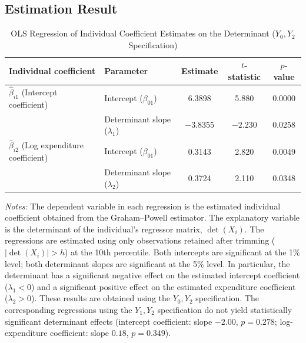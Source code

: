 \documentclass{article}
\begin{document}
\subsection{Estimation Result}

\begin{table}[htbp]
\centering
\caption{OLS Regression of Individual Coefficient Estimates on the Determinant ($Y_0,Y_2$ Specification)}
\label{tab:determinant_regression}
\begin{tabular}{llccc}
\hline
Individual coefficient & Parameter & Estimate & $t$-statistic & $p$-value \\
\hline
$\hat{\beta}_{i1}$ (Intercept coefficient)
& Intercept ($\beta_{01}$)
& 6.3898
& 5.880
& 0.0000 \\

& Determinant slope ($\lambda_1$)
& $-3.8355$
& $-2.230$
& 0.0258\\

\hline

$\hat{\beta}_{i2}$ (Log expenditure coefficient)
& Intercept ($\beta_{01}$)
& 0.3143
& 2.820
& 0.0049 \\

& Determinant slope ($\lambda_2$)
& 0.3724
& 2.110
& 0.0348 \\

\hline
\end{tabular}

\vspace{0.2cm}
\begin{minipage}{0.95\textwidth}
\footnotesize
\textit{Notes:} The dependent variable in each regression is the estimated individual coefficient obtained from the Graham--Powell estimator. The explanatory variable is the determinant of the individual's regressor matrix, $\det(X_i)$. The regressions are estimated using only observations retained after trimming ($|\det(X_i)|>h$) at the 10th percentile. Both intercepts are significant at the 1\% level; both determinant slopes are significant at the 5\% level. In particular, the determinant has a significant negative effect on the estimated intercept coefficient ($\lambda_1<0$) and a significant positive effect on the estimated expenditure coefficient ($\lambda_2>0$). These results are obtained using the $Y_0,Y_2$ specification. The corresponding regressions using the $Y_1,Y_2$ specification do not yield statistically significant determinant effects (intercept coefficient: slope $-2.00$, $p=0.278$; log-expenditure coefficient: slope $0.18$, $p=0.349$).
\end{minipage}
\end{table}
\end{document}

